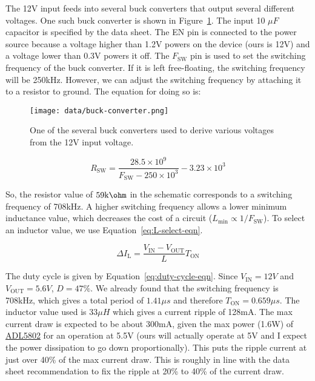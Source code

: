 \documentclass{default}
\begin{document}
The 12V input feeds into several buck converters that output several different voltages. One such
buck converter is shown in Figure~\ref{fig:buck-converter}. The input 10 $\si{\mu F}$ capacitor is
specified by the data sheet. The EN pin is connected to the power source because a voltage higher
than 1.2V powers on the device (ours is 12V) and a voltage lower than 0.3V powers it off. The
$F_{\text{SW}}$ pin is used to set the switching frequency of the buck converter. If it is left
free-floating, the switching frequency will be 250kHz. However, we can adjust the switching
frequency by attaching it to a resistor to ground. The equation for doing so is:

\begin{figure}[h]
  \centering
  \texttt{[image: data/buck-converter.png]}
  \caption{One of the several buck converters used to derive various voltages from the 12V input
    voltage.}
  \label{fig:buck-converter}
\end{figure}

\begin{equation}
  R_{\text{SW}}=\frac{28.5\times 10^9}{F_{\text{SW}}-250\times 10^3}-3.23\times 10^3
\end{equation}

So, the resistor value of $\text{59k$\ohm$}$ in the schematic corresponds to a switching frequency
of 708kHz. A higher switching frequency allows a lower minimum inductance value, which decreases the
cost of a circuit ($L_{\text{min}}\propto 1/F_{\text{SW}}$). To select an inductor value, we use
Equation~\ref{eq:L-select-eqn}.

\begin{equation}
  \Delta I_{\text{L}} = \frac{V_{\text{IN}}-V_{\text{OUT}}}{L} T_{\text{ON}}
  \label{eq:L-select-eqn}
\end{equation}

The duty cycle is given by Equation~\ref{eq:duty-cycle-eqn}. Since $V_{\text{IN}} = 12V$ and
$V_{\text{OUT}} = 5.6V$, $D = 47\%$. We already found that the switching frequency is 708kHz, which
gives a total period of $1. 41\si{\mu s}$ and therefore $T_{\text{ON}} = 0.659\si{\mu s}$. The
inductor value used is $33\si{\mu H}$ which gives a current ripple of 128mA. The max current draw is
expected to be about 300mA, given the max power (1.6W) of
\href{http://www.analog.com/media/en/technical-documentation/data-sheets/ADL5802.pdf}{ADL5802} for
an operation at 5.5V (ours will actually operate at 5V and I expect the power dissipation to go down
proportionally). This puts the ripple current at just over 40\% of the max current draw. This is
roughly in line with the data sheet recommendation to fix the ripple at 20\% to 40\% of the current
draw.
\end{document}
